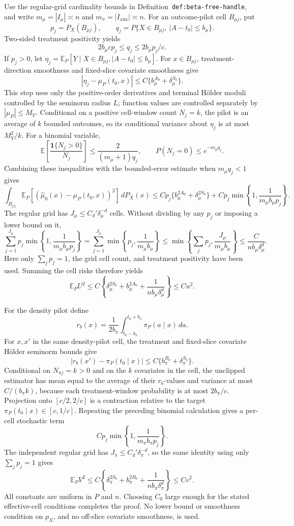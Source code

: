 Use the regular-grid cardinality bounds in Definition~\texttt{def:beta-free-handle}, and write \(m_\mu=|I_\mu|\asymp n\) and \(m_\pi=|I_{\mathrm{aux}}|\asymp n\). For an outcome-pilot cell \(B_{\mu j}\), put
\[
p_j=P_X(B_{\mu j}),
\qquad
q_j=P\{X\in B_{\mu j},\ |A-t_0|\le b_\mu\}.
\]
Two-sided treatment positivity yields
\[
2b_\mu c p_j\le q_j\le 2b_\mu p_j/c.
\]
If \(p_j>0\), let \(\eta_j=\mathbb E_P[Y\mid X\in B_{\mu j},|A-t_0|\le b_\mu]\). For \(x\in B_{\mu j}\), treatment-direction smoothness and fixed-slice covariate smoothness give
\[
|\eta_j-\mu_P(t_0,x)|
\le C\{b_\mu^{A_0}+\delta_\mu^{S_0}\}.
\]
This step uses only the positive-order derivatives and terminal H\"older moduli controlled by the seminorm radius \(L\); function values are controlled separately by \(|\mu_P|\le M_Y\). Conditional on a positive cell-window count \(N_j=k\), the pilot is an average of \(k\) bounded outcomes, so its conditional variance about \(\eta_j\) is at most \(M_Y^2/k\). For a binomial variable,
\[
\mathbb E\!\left[\frac{\mathbf1\{N_j>0\}}{N_j}\right]
\le\frac{2}{(m_\mu+1)q_j},
\qquad
P(N_j=0)\le e^{-m_\mu q_j}.
\]
Combining these inequalities with the bounded-error estimate when \(m_\mu q_j<1\) gives
\[
\int_{B_{\mu j}}\mathbb E_P[(\widehat\mu_0(x)-\mu_P(t_0,x))^2]\,dP_X(x)
\le
Cp_j\{b_\mu^{2A_0}+\delta_\mu^{2S_0}\}
+Cp_j\min\!\left\{1,\frac1{m_\mu b_\mu p_j}\right\}.
\]
The regular grid has \(J_\mu\le C_d'\delta_\mu^{-d}\) cells. Without dividing by any \(p_j\) or imposing a lower bound on it,
\[
\sum_{j=1}^{J_\mu}p_j\min\!\left\{1,\frac1{m_\mu b_\mu p_j}\right\}
=
\sum_{j=1}^{J_\mu}\min\!\left\{p_j,\frac1{m_\mu b_\mu}\right\}
\le
\min\!\left\{\sum_jp_j,\frac{J_\mu}{m_\mu b_\mu}\right\}
\le\frac{C}{nb_\mu\delta_\mu^d}.
\]
Here only \(\sum_jp_j=1\), the grid cell count, and treatment positivity have been used. Summing the cell risks therefore yields
\[
\mathbb E_PU^2
\le C\left\{
\delta_\mu^{2S_0}+b_\mu^{2A_0}+\frac1{nb_\mu\delta_\mu^d}
\right\}
\le Cu^2.
\]

For the density pilot define
\[
r_b(x)=\frac1{2b_\pi}
\int_{t_0-b_\pi}^{t_0+b_\pi}\pi_P(a\mid x)\,da.
\]
For \(x,x'\) in the same density-pilot cell, the treatment and fixed-slice covariate H\"older seminorm bounds give
\[
|r_b(x')-\pi_P(t_0\mid x)|
\le C\{b_\pi^{B_0}+\delta_\pi^{S_0}\}.
\]
Conditional on \(N_{\pi j}=k>0\) and on the \(k\) covariates in the cell, the unclipped estimator has mean equal to the average of their \(r_b\)-values and variance at most \(C/(b_\pi k)\), because each treatment-window probability is at most \(2b_\pi/c\). Projection onto \([c/2,2/c]\) is a contraction relative to the target \(\pi_P(t_0\mid x)\in[c,1/c]\). Repeating the preceding binomial calculation gives a per-cell stochastic term
\[
Cp_j\min\!\left\{1,\frac1{m_\pi b_\pi p_j}\right\}.
\]
The independent regular grid has \(J_\pi\le C_d'\delta_\pi^{-d}\), so the same identity using only \(\sum_jp_j=1\) gives
\[
\mathbb E_PV^2
\le C\left\{
\delta_\pi^{2S_0}+b_\pi^{2B_0}+\frac1{nb_\pi\delta_\pi^d}
\right\}
\le Cv^2.
\]
All constants are uniform in \(P\) and \(n\). Choosing \(C_0\) large enough for the stated effective-cell conditions completes the proof. No lower bound or smoothness condition on \(p_X\), and no off-slice covariate smoothness, is used.